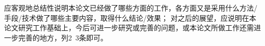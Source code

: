 

应客观地总结性说明本论文已经做了哪些方面的工作，各方面又是采用什么方法/手段/技术做了哪些主要内容，取得什么结论/效果；
对之后的展望，应说明在本论文研究工作基础上，今后可进一步研究或完善的问题，或本论文所做工作还需进一步完善的地方，列2~3条即可。

